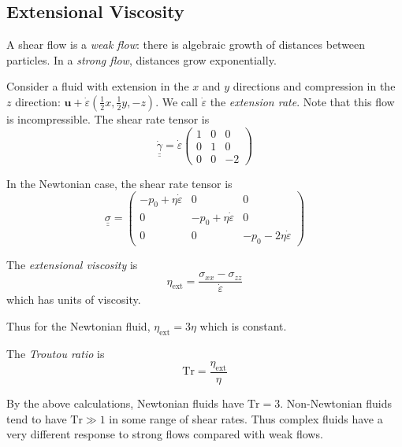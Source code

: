 \documentclass{jknotes}
\newcommand{\dunder}[1]{\underline{\underline{#1}}}
\begin{document}
\subsection{Extensional Viscosity}
A shear flow is a \emph{weak flow}: there is algebraic growth of distances
between particles. In a \emph{strong flow}, distances grow exponentially.

Consider a fluid with extension in the $x$ and $y$ directions and compression
in the $z$ direction: $\bm{u} +
\dot{\varepsilon}\left(\frac{1}{2}x,\frac{1}{2}y, -z\right)$. We call
$\dot{\varepsilon}$ the \emph{extension rate}. Note that this flow is
incompressible. The shear rate tensor is
\begin{equation}
	\dunder{\dot{\gamma}} = \dot{\varepsilon}\begin{pmatrix} 1 & 0 & 0 \\ 0 &
	1 & 0 \\ 0 & 0 & -2 \end{pmatrix}
\end{equation}

In the Newtonian case, the shear rate tensor is
\begin{equation}
	\dunder{\sigma} = \begin{pmatrix}
		-p_0 + \eta \dot{\varepsilon} & 0  & 0 \\
		0 & -p_0 + \eta \dot{\varepsilon} & 0 \\
		0 & 0 & -p_0 -2 \eta \dot{\varepsilon} 
	\end{pmatrix}
\end{equation}

\begin{defn}
	The \emph{extensional viscosity} is
	\begin{equation}
		\eta_{\text{ext}} = \frac{\sigma_{xx}-\sigma_{zz}}{\dot{\varepsilon}}
	\end{equation}
	which has units of viscosity.
\end{defn}

Thus for the Newtonian fluid, $\eta_{\text{ext}} = 3\eta$ which is constant. 
\begin{defn}
	The \emph{Troutou ratio} is 
	\begin{equation}
		\text{Tr} = \frac{\eta_{\text{ext}}}{\eta}
	\end{equation}
\end{defn}

By the above calculations, Newtonian fluids have $\text{Tr} = 3$.
Non-Newtonian fluids tend to have $\text{Tr} \gg 1$ in some range of shear
rates. Thus complex fluids have a very different response to strong flows
compared with weak flows.
\end{document}

